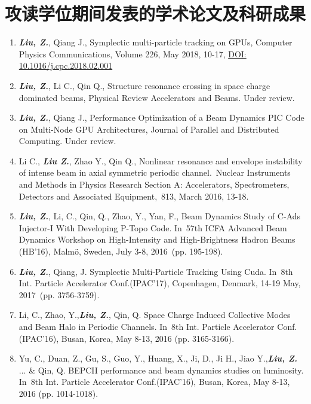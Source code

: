 \chapter{攻读学位期间发表的学术论文及科研成果}
\begin{enumerate}
  \item \textbf{\textit{Liu, Z.}}, Qiang J., Symplectic multi-particle tracking on GPUs, Computer Physics Communications, Volume 226, May 2018, 10-17, \href{https://doi.org/10.1016/j.cpc.2018.02.001}{DOI: 10.1016/j.cpc.2018.02.001}
  \item \textbf{\textit{Liu, Z.}}, Li C., Qin Q., Structure resonance crossing in space charge dominated beams, Physical Review Accelerators and Beams. \color{red}Under review\color{black}.
  \item \textbf{\textit{Liu, Z.}}, Qiang J., Performance Optimization of a Beam Dynamics PIC Code on Multi-Node GPU Architectures, Journal of Parallel and Distributed Computing. \color{red}Under review\color{black}.
  \item Li C., \textbf{\textit{Liu Z.}}, Zhao Y., Qin Q., Nonlinear resonance and envelope instability of intense beam in axial symmetric periodic channel. Nuclear Instruments and Methods in Physics Research Section A: Accelerators, Spectrometers, Detectors and Associated Equipment, 813, March 2016, 13-18.
  \item \textbf{\textit{Liu, Z.}}, Li, C., Qin, Q., Zhao, Y., Yan, F., Beam Dynamics Study of C-Ads Injector-I With Developing P-Topo Code. In 57th ICFA Advanced Beam Dynamics Workshop on High-Intensity and High-Brightness Hadron Beams (HB'16), Malmö, Sweden, July 3-8, 2016 (pp. 195-198).
  \item \textbf{\textit{Liu, Z.}}, Qiang, J. Symplectic Multi-Particle Tracking Using Cuda. In 8th Int. Particle Accelerator Conf.(IPAC'17), Copenhagen, Denmark, 14-19 May, 2017 (pp. 3756-3759).
  \item Li, C., Zhao, Y.,\textbf{\textit{Liu, Z.}},  Qin, Q. Space Charge Induced Collective Modes and Beam Halo in Periodic Channels. In 8th Int. Particle Accelerator Conf.(IPAC'16), Busan, Korea, May 8-13, 2016 (pp. 3165-3166).
  \item Yu, C., Duan, Z., Gu, S., Guo, Y., Huang, X., Ji, D., Ji H., Jiao Y.,\textbf{\textit{Liu, Z.}} ... \& Qin, Q. BEPCII performance and beam dynamics studies on luminosity. In 8th Int. Particle Accelerator Conf.(IPAC'16), Busan, Korea, May 8-13, 2016 (pp. 1014-1018).
\end{enumerate}



